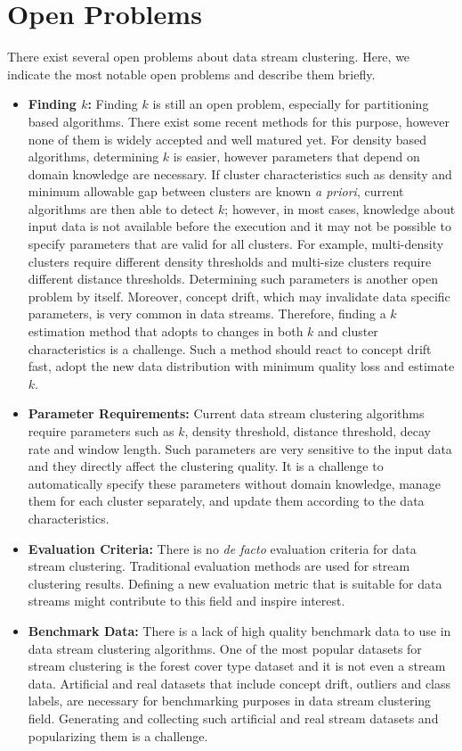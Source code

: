 \documentclass[smallcondensed]{svjour3}     %
\begin{document}
\section{Open Problems}
\label{sec:openProblems}
There exist several open problems about data stream clustering. Here, we indicate the most notable open problems and describe them briefly.
\begin{itemize}
	\item \textbf{Finding $k$:} Finding $k$ is still an open problem, especially for partitioning based algorithms. There exist some recent methods for this purpose, however none of them is widely accepted and well matured yet. For density based algorithms, determining $k$ is easier, however parameters that depend on domain knowledge are necessary. If cluster characteristics such as density and minimum allowable gap between clusters are known \textit{a priori}, current algorithms are then able to detect $k$; however, in most cases, knowledge about input data is not available before the execution and it may not be possible to specify parameters that are valid for all clusters. For example, multi-density clusters require different density thresholds and multi-size clusters require different distance thresholds. Determining such parameters is another open problem by itself. Moreover, concept drift, which may invalidate data specific parameters, is very common in data streams. Therefore, finding a $k$ estimation method that adopts to changes in both $k$ and cluster characteristics is a challenge. Such a method should react to concept drift fast, adopt the new data distribution with minimum quality loss and estimate $k$.
	\item \textbf{Parameter Requirements:} Current data stream clustering algorithms require parameters such as $k$, density threshold, distance threshold, decay rate and window length. Such parameters are very sensitive to the input data and they directly affect the clustering quality. It is a challenge to automatically specify these parameters without domain knowledge, manage them for each cluster separately, and update them according to the data characteristics.
	\item \textbf{Evaluation Criteria:} There is no \textit{de facto} evaluation criteria for data stream clustering. Traditional evaluation methods are used for stream clustering results. Defining a new evaluation metric that is suitable for data streams might contribute to this field and inspire interest.
	\item \textbf{Benchmark Data:} There is a lack of high quality benchmark data to use in data stream clustering algorithms. One of the most popular datasets for stream clustering is the forest cover type dataset and it is not even a stream data. Artificial and real datasets that include concept drift, outliers and class labels, are necessary for benchmarking purposes in data stream clustering field. Generating and collecting such artificial and real stream datasets and popularizing them is a challenge.

\end{itemize}
\end{document}
